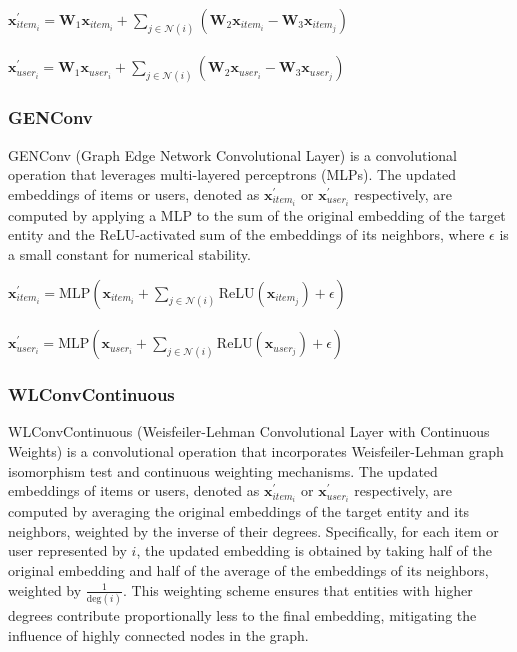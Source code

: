 \documentclass[bst/sn-nature]{sn-jnl}
\begin{document}
\begin{multicols}{2}
\begin{center}
    $\mathbf{x}^{\prime}_{item_{i}} = \mathbf{W}_1 \mathbf{x}_{item_{i}} +
    \sum_{j \in \mathcal{N}(i)}
    (\mathbf{W}_2 \mathbf{x}_{item_{i}} - \mathbf{W}_3 \mathbf{x}_{item_{j}})$ \\~\\
    $\mathbf{x}^{\prime}_{user_{i}} = \mathbf{W}_1 \mathbf{x}_{user_{i}} +
    \sum_{j \in \mathcal{N}(i)}
    (\mathbf{W}_2 \mathbf{x}_{user_{i}} - \mathbf{W}_3 \mathbf{x}_{user_{j}})$
\end{center}

\subsubsection{GENConv\cite{genconv}} 

\quad GENConv (Graph Edge Network Convolutional Layer) is a convolutional operation that leverages multi-layered perceptrons (MLPs). The updated embeddings of items or users, denoted as $\mathbf{x}^{\prime}_{item_i}$ or $\mathbf{x}^{\prime}_{user_i}$ respectively, are computed by applying a MLP to the sum of the original embedding of the target entity and the ReLU-activated sum of the embeddings of its neighbors, where $\epsilon$ is a small constant for numerical stability. \\ 

\begin{center}
    $\mathbf{x}_{item_{i}}^{\prime} = \mathrm{MLP} \left( \mathbf{x}_{item_{i}} +
    \sum_{j \in \mathcal{N}(i)} 
    \mathrm{ReLU} \left( \mathbf{x}_{item_{j}} \right) +\epsilon \right)$ \\~\\
    $\mathbf{x}_{user_{i}}^{\prime} = \mathrm{MLP} \left( \mathbf{x}_{user_{i}} +
    \sum_{j \in \mathcal{N}(i)} 
    \mathrm{ReLU} \left( \mathbf{x}_{user_{j}} \right) +\epsilon \right)$ 
\end{center}

\subsubsection{WLConvContinuous\cite{wlconvcontinuous}} 

\quad WLConvContinuous (Weisfeiler-Lehman Convolutional Layer with Continuous Weights) is a convolutional operation that incorporates Weisfeiler-Lehman graph isomorphism test and continuous weighting mechanisms. The updated embeddings of items or users, denoted as $\mathbf{x}^{\prime}_{item_i}$ or $\mathbf{x}^{\prime}_{user_i}$ respectively, are computed by averaging the original embeddings of the target entity and its neighbors, weighted by the inverse of their degrees. Specifically, for each item or user represented by $i$, the updated embedding is obtained by taking half of the original embedding and half of the average of the embeddings of its neighbors, weighted by $\frac{1}{\text{deg}(i)}$. This weighting scheme ensures that entities with higher degrees contribute proportionally less to the final embedding, mitigating the influence of highly connected nodes in the graph. \\ 


\end{multicols}
\end{document}
